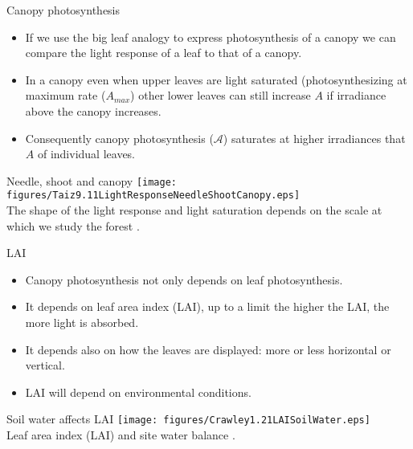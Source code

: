 \documentclass[10pt]{beamer}
\begin{document}
\begin{frame}{Canopy photosynthesis}
    \begin{itemize}
        \item If we use the big leaf analogy to express
        photosynthesis of a canopy we can compare the light
        response of a leaf to that of a canopy.%
        \item In a canopy even when upper leaves are light saturated
        (photosynthesizing at maximum rate ($A_{max}$) other lower
        leaves can still increase $A$ if irradiance above the canopy
        increases.
        \item Consequently canopy photosynthesis ($\mathcal{A}$)
        saturates at higher irradiances that $A$ of individual
        leaves.
    \end{itemize}
\end{frame}

\begin{frame}{Needle, shoot and canopy}
    \centering
    \texttt{[image: figures/Taiz9.11LightResponseNeedleShootCanopy.eps]}\\
    {\small The shape of the light response and light saturation
    depends on the scale at which we study the forest
    \autocite[from][]{TaiZei2006}.}
\end{frame}

\begin{frame}{LAI}
    \begin{itemize}
        \item Canopy photosynthesis not only depends on leaf
        photosynthesis.
        \item It depends on leaf area index (LAI), up to a limit the higher the LAI,
        the more light is absorbed.
        \item It depends also on how the leaves are displayed:
        more or less horizontal or vertical.
        \item LAI will depend on environmental conditions.
    \end{itemize}
\end{frame}

\begin{frame}{Soil water affects LAI}
    \centering
    \texttt{[image: figures/Crawley1.21LAISoilWater.eps]}\\
    {\small Leaf area index (LAI) and site water balance \autocite[from][]{Crawley1997}.}
\end{frame}
\end{document}
